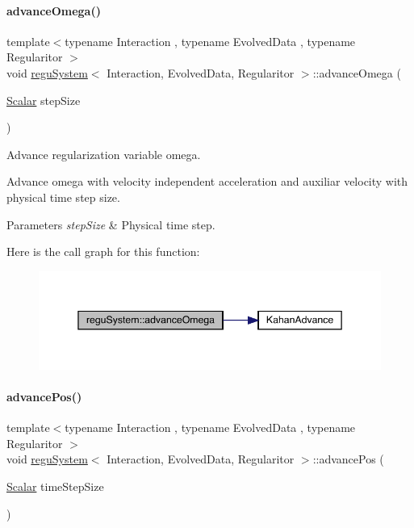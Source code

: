 \paragraph{\texorpdfstring{advance\+Omega()}{advanceOmega()}}
{\footnotesize\ttfamily template$<$typename Interaction , typename Evolved\+Data , typename Regularitor $>$ \\
void \mbox{\hyperlink{classregu_system}{regu\+System}}$<$ Interaction, Evolved\+Data, Regularitor $>$\+::advance\+Omega (\begin{DoxyParamCaption}\item[{\mbox{\hyperlink{classregu_system_aca8ee2c387943164ee3ea68370fc3ac0}{Scalar}}}]{step\+Size }\end{DoxyParamCaption})\hspace{0.3cm}{\ttfamily [private]}}



Advance regularization variable omega. 

Advance omega with velocity independent acceleration and auxiliar velocity with physical time step size. 
\begin{DoxyParams}{Parameters}
{\em step\+Size} & Physical time step. \\
\hline
\end{DoxyParams}
Here is the call graph for this function\+:\nopagebreak
\begin{figure}[H]
\begin{center}
\leavevmode
\includegraphics[width=345pt]{classregu_system_ad04ed572a5718219d506af6cd924a395_cgraph}
\end{center}
\end{figure}
\mbox{\label{classregu_system_ab1964e22d3d7f6ddaa51c5e7a02534a5}} 
\paragraph{\texorpdfstring{advance\+Pos()}{advancePos()}}
{\footnotesize\ttfamily template$<$typename Interaction , typename Evolved\+Data , typename Regularitor $>$ \\
void \mbox{\hyperlink{classregu_system}{regu\+System}}$<$ Interaction, Evolved\+Data, Regularitor $>$\+::advance\+Pos (\begin{DoxyParamCaption}\item[{\mbox{\hyperlink{classregu_system_aca8ee2c387943164ee3ea68370fc3ac0}{Scalar}}}]{time\+Step\+Size }\end{DoxyParamCaption})}



